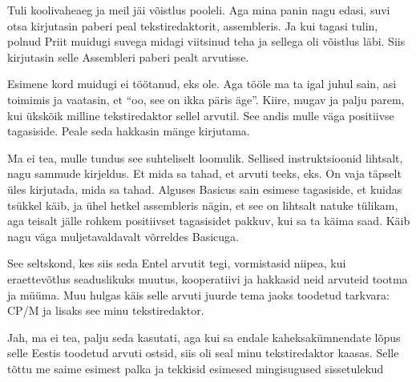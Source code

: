 Tuli koolivaheaeg ja meil jäi võistlus pooleli. Aga mina panin nagu edasi, suvi 
otsa kirjutasin paberi peal tekstiredaktorit, assembleris. Ja kui tagasi tulin, 
polnud  Priit muidugi suvega midagi viitsinud teha ja sellega oli võistlus 
läbi. Siis kirjutasin selle Assembleri paberi pealt arvutisse.


Esimene kord muidugi ei töötanud, eks ole. Aga tööle ma ta igal juhul sain, asi 
toimimis ja  vaatasin, et \enquote{oo, see on ikka päris äge}. Kiire, mugav ja 
palju parem, kui ükskõik milline tekstiredaktor sellel arvutil. See andis mulle 
väga positiivse tagasiside. Peale seda hakkasin mänge kirjutama.


Ma ei tea, mulle tundus see suhteliselt loomulik. Sellised instruktsioonid 
lihtsalt, nagu sammude kirjeldus. Et mida sa tahad, et arvuti teeks, eks. On 
vaja täpselt üles kirjutada, mida sa tahad. Alguses Basicus sain esimese 
tagasiside, et kuidas tsükkel käib, ja ühel hetkel assembleris nägin, et see on 
lihtsalt natuke tülikam, aga teisalt jälle rohkem positiivset tagasisidet 
pakkuv, kui sa ta käima saad. Käib nagu väga muljetavaldavalt võrreldes 
Basicuga. 


See seltskond, kes siis seda Entel arvutit tegi, 
vormistasid niipea, kui eraettevõtlus seaduslikuks muutus, kooperatiivi ja 
hakkasid  neid arvuteid tootma ja müüma. Muu hulgas käis selle arvuti juurde 
tema jaoks toodetud tarkvara: CP/M ja  lisaks see minu tekstiredaktor.


Jah, ma ei tea, palju seda kasutati, aga kui sa endale kaheksakümnendate lõpus 
selle Eestis toodetud arvuti ostsid, siis oli seal minu tekstiredaktor kaasas. 
Selle tõttu me saime esimest palka ja tekkisid esimesed mingisugused 
sissetulekud


